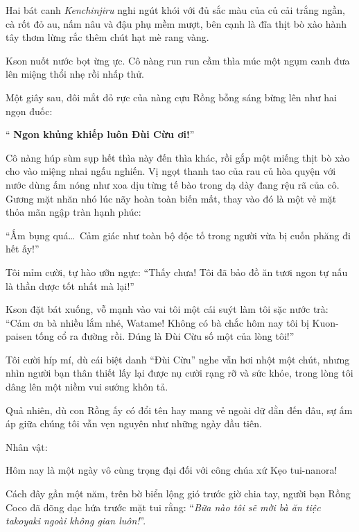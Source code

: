 \documentclass[../main.tex]{subfiles}
\begin{document}
Hai bát canh \textit{Kenchinjiru} nghi ngút khói với đủ sắc màu của củ cải trắng ngần, cà rốt đỏ au, nấm nâu và đậu phụ mềm mượt, bên cạnh là đĩa thịt bò xào hành tây thơm lừng rắc thêm chút hạt mè rang vàng.

Kson nuốt nước bọt ừng ực. Cô nàng run run cầm thìa múc một ngụm canh đưa lên miệng thổi nhẹ rồi nhấp thử.

Một giây sau, đôi mắt đỏ rực của nàng cựu Rồng bỗng sáng bừng lên như hai ngọn đuốc:

``\textbf{ Ngon khủng khiếp luôn Đùi Cừu ơi!}''

Cô nàng húp sùm sụp hết thìa này đến thìa khác, rồi gắp một miếng thịt bò xào cho vào miệng nhai ngấu nghiến. Vị ngọt thanh tao của rau củ hòa quyện với nước dùng ấm nóng như xoa dịu từng tế bào trong dạ dày đang rệu rã của cô. Gương mặt nhăn nhó lúc nãy hoàn toàn biến mất, thay vào đó là một vẻ mặt thỏa mãn ngập tràn hạnh phúc:

``Ấm bụng quá\dots\ Cảm giác như toàn bộ độc tố trong người vừa bị cuốn phăng đi hết ấy!''

Tôi mỉm cười, tự hào ưỡn ngực: ``Thấy chưa! Tôi đã bảo đồ ăn tươi ngon tự nấu là thần dược tốt nhất mà lại!''

Kson đặt bát xuống, vỗ mạnh vào vai tôi một cái suýt làm tôi sặc nước trà: ``Cảm ơn bà nhiều lắm nhé, Watame! Không có bà chắc hôm nay tôi bị Kuon-paisen tống cổ ra đường rồi. Đúng là Đùi Cừu số một của lòng tôi!''

Tôi cười híp mí, dù cái biệt danh ``Đùi Cừu'' nghe vẫn hơi nhột một chút, nhưng nhìn người bạn thân thiết lấy lại được nụ cười rạng rỡ và sức khỏe, trong lòng tôi dâng lên một niềm vui sướng khôn tả.

Quả nhiên, dù con Rồng ấy có đổi tên hay mang vẻ ngoài dữ dằn đến đâu, sự ấm áp giữa chúng tôi vẫn vẹn nguyên như những ngày đầu tiên.

\newpage

\begin{center}
  {\caviar\fontsize{12pt}{12pt}\selectfont Nhân vật:  }
\end{center}


Hôm nay là một ngày vô cùng trọng đại đối với công chúa xứ Kẹo tui-nanora!

Cách đây gần một năm, trên bờ biển lộng gió trước giờ chia tay, người bạn Rồng Coco đã dõng dạc hứa trước mặt tui rằng: ``\textit{Bữa nào tôi sẽ mời bà ăn tiệc takoyaki ngoài không gian luôn!}''.
\end{document}
